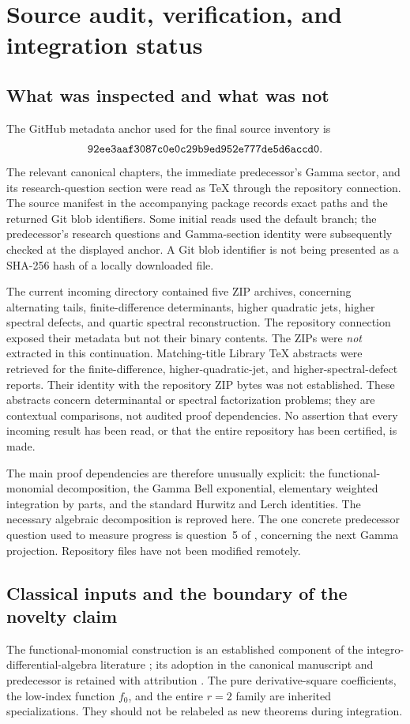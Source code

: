 \section{Source audit, verification, and integration status}
\label{ag:sec:audit}

\subsection{What was inspected and what was not}
The GitHub metadata anchor used for the final source inventory is
\[
 \texttt{92ee3aaf3087c0e0c29b9ed952e777de5d6accd0}.
\]
The relevant canonical chapters, the immediate predecessor's Gamma
sector, and its research-question section were read as TeX through the
repository connection. The source manifest in the accompanying package
records exact paths and the returned Git blob identifiers. Some initial
reads used the default branch; the predecessor's research questions and
Gamma-section identity were subsequently checked at the displayed
anchor. A Git blob identifier is not being presented as a SHA-256 hash
of a locally downloaded file.

The current incoming directory contained five ZIP archives, concerning
alternating tails, finite-difference determinants, higher quadratic jets,
higher spectral defects, and quartic spectral reconstruction. The
repository connection exposed their metadata but not their binary
contents. The ZIPs were \emph{not} extracted in this continuation.
Matching-title Library TeX abstracts were retrieved for the
finite-difference, higher-quadratic-jet, and higher-spectral-defect
reports. Their identity with the repository ZIP bytes was not
established. These abstracts concern determinantal or spectral
factorization problems; they are contextual comparisons, not audited
proof dependencies. No assertion that every incoming result has been
read, or that the entire repository has been certified, is made.

The main proof dependencies are therefore unusually explicit: the
functional-monomial decomposition, the Gamma Bell exponential, elementary
weighted integration by parts, and the standard Hurwitz and Lerch
identities. The necessary algebraic decomposition is reproved here.
The one concrete predecessor question used to measure progress is
question~5 of \cite[Section~8]{HTG}, concerning the next Gamma
projection. Repository files have not been modified remotely.

\subsection{Classical inputs and the boundary of the novelty claim}
The functional-monomial construction is an established component of the
integro-differential-algebra literature \cite{GRR}; its adoption in the
canonical manuscript and predecessor is retained with attribution
\cite{Manuscript,HTG}. The pure derivative-square coefficients, the
low-index function $f_0$, and the entire $r=2$ family are inherited
specializations. They should not be relabeled as new theorems during
integration.

